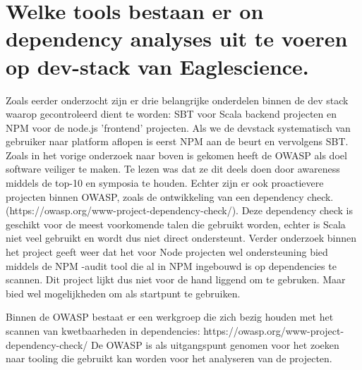 \section{Welke tools bestaan er on dependency analyses uit te voeren op dev-stack van Eaglescience.}\label{sec:welke-tools-bestaan-er-on-dependency-analyses-uit-te-voeren-op-dev-stack-van-eaglescience.}
Zoals eerder onderzocht zijn er drie belangrijke onderdelen binnen de dev stack waarop gecontroleerd dient te worden: SBT voor Scala backend projecten en NPM voor de node.js 'frontend' projecten. Als we de dev\-stack systematisch van gebruiker naar platform aflopen is eerst NPM aan de beurt en vervolgens SBT. Zoals in het vorige onderzoek naar boven is gekomen heeft de OWASP als doel software veiliger te maken. Te lezen was dat ze dit deels doen door awareness middels de top-10 en symposia te houden. Echter zijn er ook proactievere projecten binnen OWASP, zoals de ontwikkeling van een dependency check. (https://owasp.org/www-project-dependency-check/). Deze dependency check is geschikt voor de meest voorkomende talen die gebruikt worden, echter is Scala niet veel gebruikt en wordt dus niet direct ondersteunt. Verder onderzoek binnen het project geeft weer dat het voor Node projecten wel ondersteuning bied middels de NPM -audit tool die al in NPM ingebouwd is op dependencies te scannen. Dit project lijkt dus niet voor de hand liggend om te gebruken. Maar bied wel mogelijkheden om als startpunt te gebruiken.

Binnen de OWASP bestaat er een werkgroep die zich bezig houden met het scannen van kwetbaarheden in dependencies: https://owasp.org/www-project-dependency-check/  De OWASP is als uitgangspunt genomen voor het zoeken naar tooling die gebruikt kan worden voor het analyseren van de projecten.


